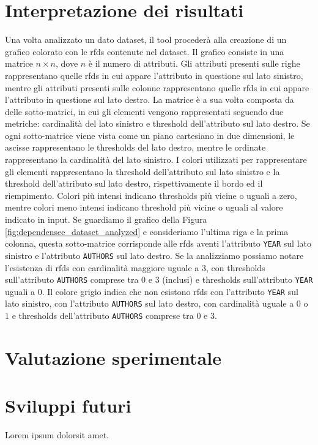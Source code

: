\section{Interpretazione dei risultati}
Una volta analizzato un dato dataset, il tool proceder\`{a} alla creazione di un grafico colorato con le \acrlong{rfds} contenute nel dataset. Il grafico consiste in una matrice $n\times n$, dove $n$ \`{e} il numero di attributi. Gli attributi presenti sulle righe rappresentano quelle \acrshort{rfds} in cui appare l'attributo in questione sul lato sinistro, mentre gli attributi presenti sulle colonne rappresentano quelle \acrshort{rfds} in cui appare l'attributo in questione sul lato destro. La matrice \`{e} a sua volta composta da delle sotto-matrici, in cui gli elementi vengono rappresentati seguendo due metriche: cardinalit\`{a} del lato sinistro e threshold dell'attributo sul lato destro. Se ogni sotto-matrice viene vista come un piano cartesiano in due dimensioni, le ascisse rappresentano le thresholds del lato destro, mentre le ordinate rappresentano la cardinalit\`{a} del lato sinistro. I colori utilizzati per rappresentare gli elementi rappresentano la threshold dell'attributo sul lato sinistro e la threshold dell'attributo sul lato destro, rispettivamente il bordo ed il riempimento. Colori pi\`{u} intensi indicano thresholds pi\`{u} vicine o uguali a zero, mentre colori meno intensi indicano threshold pi\`{u} vicine o uguali al valore indicato in input. Se guardiamo il grafico della Figura \ref{fig:dependensee_dataset_analyzed} e consideriamo l'ultima riga e la prima colonna, questa sotto-matrice corrisponde alle \acrshort{rfds} aventi l'attributo \texttt{YEAR} sul lato sinistro e l'attributo \texttt{AUTHORS} sul lato destro. Se la analizziamo possiamo notare l'esistenza di \acrshort{rfds} con cardinalit\`{a} maggiore uguale a $3$, con thresholds sull'attributo \texttt{AUTHORS} comprese tra $0$ e $3$ (inclusi) e thresholds sull'attributo \texttt{YEAR} uguali a $0$. Il colore grigio indica che non esistono \acrshort{rfds} con l'attributo \texttt{YEAR} sul lato sinistro, con l'attributo \texttt{AUTHORS} sul lato destro, con cardinalit\`{a} uguale a $0$ o $1$ e thresholds dell'attributo \texttt{AUTHORS} comprese tra $0$ e $3$.

\section{Valutazione sperimentale}

\section{Sviluppi futuri}
Lorem ipsum dolorsit amet.